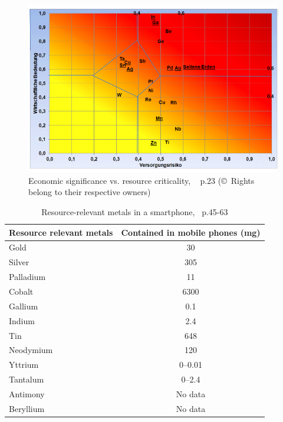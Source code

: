 \documentclass[11pt]{scrartcl}
\begin{document}
%
\begin{figure} [H]
    \includegraphics[width=\textwidth]{img/criticality}
    \caption{Economic significance vs. resource criticality, ~\cite{Studie} p.23 (\copyright~Rights belong to their respective owners)}%
    \label{fig:crit}
\end{figure}
%
\begin{table} [H]
    \centering
    \begin{tabular}{l c}
        \toprule
        \textbf{Resource relevant metals} & \textbf{Contained in mobile phones (mg)} \\ \midrule
        Gold & 30 \\ \midrule
        Silver & 305 \\ \midrule
        Palladium & 11 \\ \midrule
        Cobalt	& 6300 \\ \midrule
        Gallium	& 0.1 \\ \midrule
        Indium	& 2.4 \\ \midrule
        Tin	& 648 \\ \midrule
        Neodymium & 120 \\ \midrule
        Yttrium	& 0--0.01 \\ \midrule
        Tantalum & 0--2.4 \\ \midrule
        Antimony & No data \\ \midrule
        Beryllium & No data \\ \bottomrule
    \end{tabular}
    \caption{Resource-relevant metals in a smartphone,~\cite{Studie} p.45-63}%
    \label{tbl:crit}
\end{table}
\end{document}
